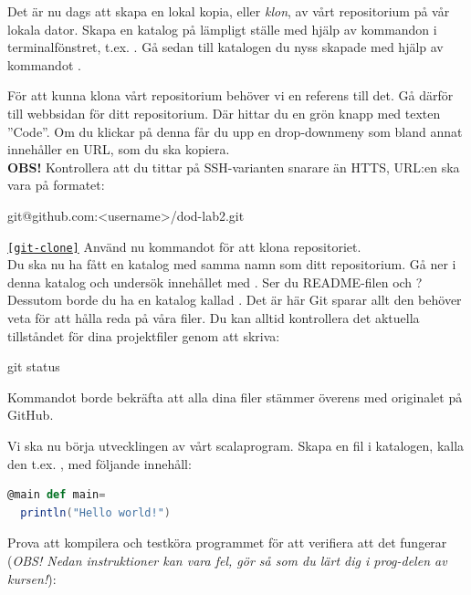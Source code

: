 \begin{Datorarbete}
\item Det är nu dags att skapa en lokal kopia, eller \emph{klon}, av vårt repositorium på vår lokala dator. Skapa en katalog på lämpligt ställe med hjälp av kommandon i terminalfönstret, t.ex. . Gå sedan till katalogen du nyss skapade med hjälp av kommandot .

För att kunna klona vårt repositorium behöver vi en referens till det. Gå därför till webbsidan för ditt repositorium. Där hittar du en grön knapp med texten ''Code''. Om du klickar på denna får du upp en drop-downmeny som bland annat innehåller en URL, som du ska kopiera.
\\


\textbf{OBS!} Kontrollera att du tittar på SSH-varianten snarare än HTTS, URL:en ska vara på formatet:
\vspace{-.5em}
\begin{Code}
git@github.com:<username>/dod-lab2.git
\end{Code}
\vspace{.5em}

\texttt{\ref{git-clone}} Använd nu kommandot  för att klona repositoriet.
\\

Du ska nu ha fått en katalog med samma namn som ditt repositorium. Gå ner i denna katalog och undersök innehållet med . Ser du README-filen och ? Dessutom borde du ha en katalog kallad . Det är här Git sparar allt den behöver veta för att hålla reda på våra filer.
Du kan alltid kontrollera det aktuella tillståndet för dina projektfiler genom att skriva:

\begin{Code}
git status
\end{Code}

Kommandot borde bekräfta att alla dina filer stämmer överens med originalet på GitHub.

\item Vi ska nu börja utvecklingen av vårt scalaprogram. Skapa en fil i katalogen, kalla den t.ex. , med följande innehåll:

\begin{lstlisting}[language=scala]
@main def main=
  println("Hello world!")
\end{lstlisting}

Prova att kompilera och testköra programmet för att verifiera att det fungerar (\emph{OBS! Nedan instruktioner kan vara fel, gör så som du lärt dig i prog-delen av kursen!}):


\end{Datorarbete}

